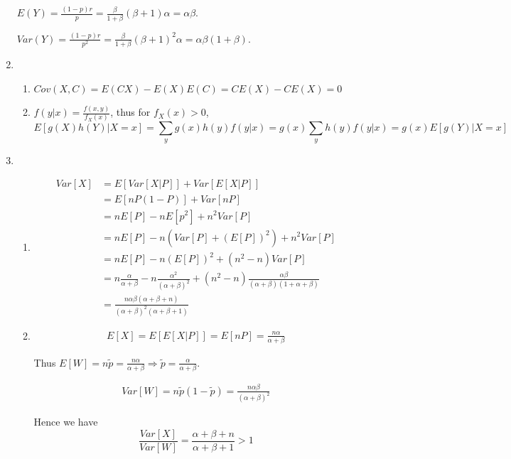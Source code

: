 \documentclass{article}
\begin{document}
\begin{enumerate}[leftmargin = 0 em, label = \arabic*., font = \bfseries]
$E(Y) = \frac{(1 - p) r}{p} = \frac{\beta}{1 + \beta} (\beta + 1) \alpha = \alpha \beta$.

$Var(Y) = \frac{(1- p)r}{p^2} = \frac{\beta}{1 + \beta} (\beta + 1)^2 \alpha = \alpha \beta (1 + \beta)$.
	
	
	\item 
	\begin{enumerate}
		\item 
		$Cov(X , C) = E(CX) - E(X)E(C) = C E(X) - C E(X) = 0$

		\item 
		$f(y|x) = \frac{f(x,y)}{f_X(x)}$, thus for $f_X (x) > 0$,
		\[E[g(X)h(Y)|X = x] = \sum_{y} g(x)h(y) f(y|x) = g(x) \sum_{y}h(y) f(y|x) = g(x) E[g(Y)|X = x]\]
	\end{enumerate}
	
	\item 
	\begin{enumerate}
		\item 
		\begin{align*}
		Var[X] &= E[Var[X | P]] + Var[E[X | P]]\\
			& = E[nP(1 - P)] + Var[nP]\\
			& = nE[P] - nE[p^2] + n^2 Var[P]\\
			& = n E[P] - n(Var[P] + (E[P])^2) + n^2 Var[P]\\
			& = n E[P] - n (E[P])^2 + (n^2 - n )Var[P]\\
			& = n \frac{\alpha}{\alpha + \beta} - n \frac{\alpha^2}{(\alpha + \beta)^2} + (n^2 - n ) \frac{\alpha \beta}{(\alpha + \beta) (1 + \alpha + \beta)}\\
			& = \frac{n \alpha \beta (\alpha + \beta + n)}{(\alpha + \beta)^2 (\alpha + \beta +1)}
		\end{align*}
		
		\item 
		\begin{align*}
		E[X] = E[E[X | P]] = E[nP] = \frac{n \alpha}{\alpha + \beta} 
		\end{align*}

		Thus $E[W] = n \tilde{p} = \frac{n \alpha }{\alpha + \beta} \Rightarrow \tilde{p} = \frac{\alpha}{\alpha + \beta}$.

		\begin{align*}
		Var[W] = n \tilde{p}(1 - \tilde{p}) = \frac{n \alpha \beta}{(\alpha + \beta)^2}
		\end{align*}

		Hence we have
		\[\frac{Var[X]}{Var[W]} = \frac{\alpha + \beta + n}{\alpha + \beta + 1} > 1\]
		

\end{enumerate}
\end{enumerate}
\end{document}
